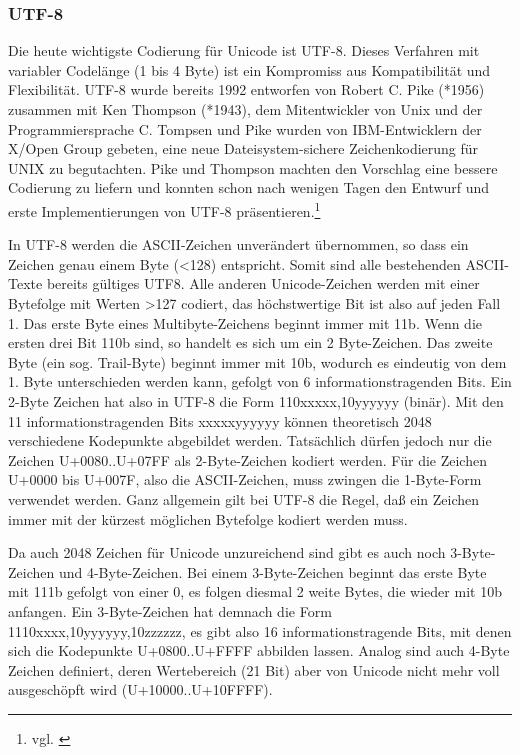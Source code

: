 \subsubsection{UTF-8}
Die heute wichtigste Codierung für Unicode ist UTF-8. Dieses Verfahren mit variabler Codelänge (1 bis 4 Byte) ist ein Kompromiss aus Kompatibilität und Flexibilität. UTF-8 wurde bereits 1992 entworfen von Robert C. Pike (*1956) zusammen mit Ken Thompson (*1943), dem Mitentwickler von Unix und der Programmiersprache C. Tompsen und Pike wurden von IBM-Entwicklern der X/Open Group gebeten, eine neue Dateisystem-sichere Zeichenkodierung für UNIX zu begutachten. Pike und Thompson machten den Vorschlag eine bessere Codierung zu liefern und konnten schon nach wenigen Tagen den Entwurf und erste Implementierungen von UTF-8 präsentieren.\footnote{vgl. \cite{Pike2003}}

In UTF-8 werden die ASCII-Zeichen unverändert übernommen, so dass ein Zeichen genau einem Byte (<128) entspricht. Somit sind alle bestehenden ASCII-Texte bereits gültiges UTF8. Alle anderen Unicode-Zeichen werden mit einer Bytefolge mit Werten >127 codiert, das höchstwertige Bit ist also auf jeden Fall 1. Das erste Byte eines Multibyte-Zeichens beginnt immer mit 11b. Wenn die ersten drei Bit 110b sind, so handelt es sich um ein 2 Byte-Zeichen. Das zweite Byte (ein sog. Trail-Byte) beginnt immer mit 10b, wodurch es eindeutig von dem 1. Byte unterschieden werden kann, gefolgt von 6 informationstragenden Bits. Ein 2-Byte Zeichen hat also in UTF-8 die Form 110xxxxx,10yyyyyy (binär). Mit den 11 informationstragenden Bits xxxxxyyyyyy können theoretisch 2048 verschiedene Kodepunkte abgebildet werden. Tatsächlich dürfen jedoch nur die Zeichen U+0080..U+07FF als 2-Byte-Zeichen kodiert werden. Für die Zeichen U+0000 bis U+007F, also die ASCII-Zeichen, muss zwingen die 1-Byte-Form verwendet werden. Ganz allgemein gilt bei UTF-8 die Regel, daß ein Zeichen immer mit der kürzest möglichen Bytefolge kodiert werden muss.

Da auch 2048 Zeichen für Unicode unzureichend sind gibt es auch noch 3-Byte-Zeichen und 4-Byte-Zeichen. Bei einem 3-Byte-Zeichen beginnt das erste Byte mit 111b gefolgt von einer 0, es folgen diesmal 2 weite Bytes, die wieder mit 10b anfangen. Ein 3-Byte-Zeichen hat demnach die Form 1110xxxx,10yyyyyy,10zzzzzz, es gibt also 16 informationstragende Bits, mit denen sich die Kodepunkte U+0800..U+FFFF abbilden lassen. Analog sind auch 4-Byte Zeichen definiert, deren Wertebereich (21 Bit) aber von Unicode nicht mehr voll ausgeschöpft wird (U+10000..U+10FFFF).

